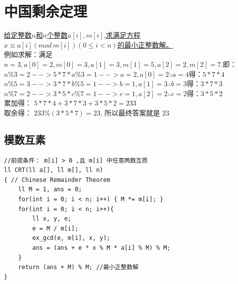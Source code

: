 \section{中国剩余定理}
\underline{给定整数$n$和$n$个整数$a[i],m[i]$,求满足方程$ x \equiv a[i] (mod\  m[i])(0\leq i<n)$的最小正整数解。} \\

例如求解：满足$n = 3, a[0] = 2, m[0] = 3, a[1] = 3, m[1] = 5, a[2] = 2, m[2] = 7$.即： \\
$n \% 3 = 2 --> 5 * 7 * a \% 3 = 1 --> a = 2,a[0] = 2 \therefore a = 4 $得$：5 * 7 * 4$ \\
$n \% 5 = 3 --> 3 * 7 * b \% 5 = 1 --> b = 1,a[1] = 3 \therefore b = 3 $得$：3 * 7 * 3$ \\
$n \% 7 = 2 --> 3 * 5 * c \% 7 = 1 --> c = 1,a[2] = 2 \therefore c = 2 $得$：3 * 5 * 2$ \\
累加得： $5 * 7 * 4 + 3 * 7 * 3 + 3 * 5 * 2 = 233$ \\
取余得： $233 \% (3 * 5 * 7)= 23$, 所以最终答案就是 $23$

\subsection{模数互素}
\begin{lstlisting}
//前提条件： m[i] > 0 ,且 m[i] 中任意两数互质
ll CRT(ll a[], ll m[], ll n)
{ // Chinese Remainder Theorem
    ll M = 1, ans = 0;
    for(int i = 0; i < n; i++) { M *= m[i]; }
    for(int i = 0; i < n; i++){
        ll x, y, e;
        e = M / m[i];
        ex_gcd(e, m[i], x, y);
        ans = (ans + e * x % M * a[i] % M) % M;
    }
    return (ans + M) % M; //最小正整数解
}
\end{lstlisting}
